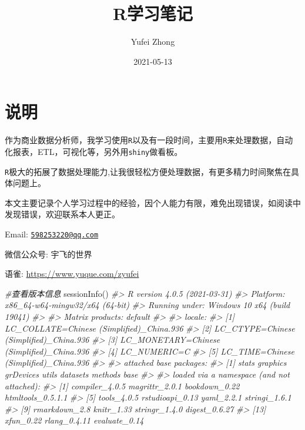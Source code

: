 \documentclass[
]{book}
\title{R学习笔记}
\author{Yufei Zhong}
\date{2021-05-13}
\newenvironment{Shaded}{\begin{snugshade}}{\end{snugshade}}
\newcommand{\CommentTok}[1]{\textcolor[rgb]{0.56,0.35,0.01}{\textit{#1}}}
\newcommand{\FunctionTok}[1]{\textcolor[rgb]{0.00,0.00,0.00}{#1}}
\newcommand{\NormalTok}[1]{#1}
\begin{document}
\maketitle

{
\setcounter{tocdepth}{1}
\tableofcontents
}
\hypertarget{ux8bf4ux660e}{%
\chapter{说明}\label{ux8bf4ux660e}}

作为商业数据分析师，我学习使用\texttt{R}以及有一段时间，主要用\texttt{R}来处理数据，自动化报表，ETL，可视化等，另外用\texttt{shiny}做看板。

\texttt{R}极大的拓展了数据处理能力,让我很轻松方便处理数据，有更多精力时间聚焦在具体问题上。

本文主要记录个人学习过程中的经验，因个人能力有限，难免出现错误，如阅读中发现错误，欢迎联系本人更正。

Email: \href{mailto:598253220@qq.com}{\nolinkurl{598253220@qq.com}}

微信公众号: 宇飞的世界

语雀: \url{https://www.yuque.com/zyufei}

\begin{Shaded}
\begin{Highlighting}[]
\CommentTok{\#查看版本信息}
\FunctionTok{sessionInfo}\NormalTok{()}
\CommentTok{\#\textgreater{} R version 4.0.5 (2021{-}03{-}31)}
\CommentTok{\#\textgreater{} Platform: x86\_64{-}w64{-}mingw32/x64 (64{-}bit)}
\CommentTok{\#\textgreater{} Running under: Windows 10 x64 (build 19041)}
\CommentTok{\#\textgreater{} }
\CommentTok{\#\textgreater{} Matrix products: default}
\CommentTok{\#\textgreater{} }
\CommentTok{\#\textgreater{} locale:}
\CommentTok{\#\textgreater{} [1] LC\_COLLATE=Chinese (Simplified)\_China.936 }
\CommentTok{\#\textgreater{} [2] LC\_CTYPE=Chinese (Simplified)\_China.936   }
\CommentTok{\#\textgreater{} [3] LC\_MONETARY=Chinese (Simplified)\_China.936}
\CommentTok{\#\textgreater{} [4] LC\_NUMERIC=C                              }
\CommentTok{\#\textgreater{} [5] LC\_TIME=Chinese (Simplified)\_China.936    }
\CommentTok{\#\textgreater{} }
\CommentTok{\#\textgreater{} attached base packages:}
\CommentTok{\#\textgreater{} [1] stats     graphics  grDevices utils     datasets  methods   base     }
\CommentTok{\#\textgreater{} }
\CommentTok{\#\textgreater{} loaded via a namespace (and not attached):}
\CommentTok{\#\textgreater{}  [1] compiler\_4.0.5    magrittr\_2.0.1    bookdown\_0.22     htmltools\_0.5.1.1}
\CommentTok{\#\textgreater{}  [5] tools\_4.0.5       rstudioapi\_0.13   yaml\_2.2.1        stringi\_1.6.1    }
\CommentTok{\#\textgreater{}  [9] rmarkdown\_2.8     knitr\_1.33        stringr\_1.4.0     digest\_0.6.27    }
\CommentTok{\#\textgreater{} [13] xfun\_0.22         rlang\_0.4.11      evaluate\_0.14}
\end{Highlighting}
\end{Shaded}
\end{document}
